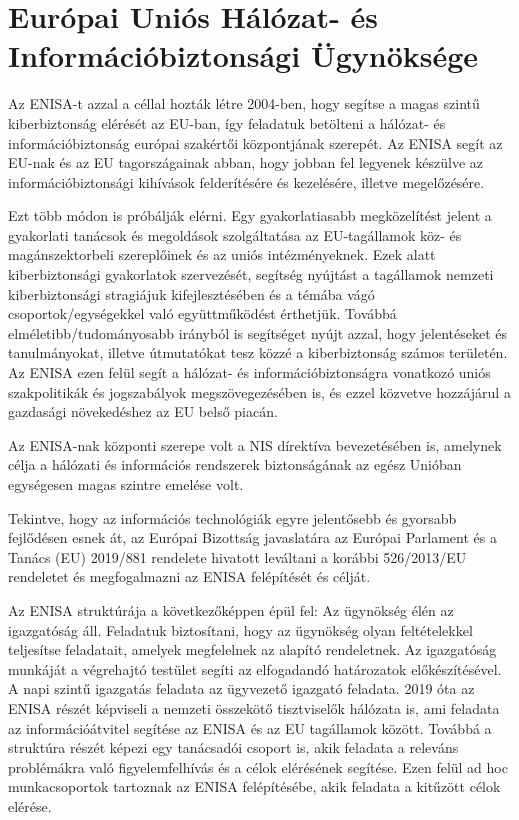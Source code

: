 \section{Európai Uniós Hálózat- és Információbiztonsági Ügynöksége}

Az ENISA-t azzal a céllal hozták létre 2004-ben, hogy segítse a magas szintű kiberbiztonság elérését az EU-ban, így feladatuk betölteni a hálózat- és információbiztonság európai szakértői központjának szerepét. Az ENISA segít az EU-nak és az EU tagországainak abban, hogy jobban fel legyenek készülve az információbiztonsági kihívások felderítésére és kezelésére, illetve megelőzésére.

Ezt több módon is próbálják elérni. Egy gyakorlatiasabb megközelítést jelent a gyakorlati tanácsok és megoldások szolgáltatása az EU-tagállamok köz- és magánszektorbeli szereplőinek és az uniós intézményeknek. Ezek alatt kiberbiztonsági gyakorlatok szervezését, segítség nyújtást a tagállamok nemzeti kiberbiztonsági stragiájuk kifejlesztésében és a témába vágó csoportok/egységekkel való együttműködést érthetjük. Továbbá elméletibb/tudományosabb irányból is segítséget nyújt azzal, hogy jelentéseket és tanulmányokat, illetve útmutatókat tesz közzé a kiberbiztonság számos területén. Az ENISA ezen felül segít a hálózat- és információbiztonságra vonatkozó uniós szakpolitikák és jogszabályok megszövegezésében is, és ezzel közvetve hozzájárul a gazdasági növekedéshez az EU belső piacán.

Az ENISA-nak központi szerepe volt a NIS dírektíva bevezetésében is, amelynek célja a hálózati és információs rendszerek biztonságának az egész Unióban egységesen magas szintre emelése volt. \cite{NIS-direktiva}

Tekintve, hogy az információs technológiák egyre jelentősebb és gyorsabb fejlődésen esnek át, az Európai Bizottság javaslatára az Európai Parlament és a Tanács (EU) 2019/881 rendelete \cite{2019/881} hivatott leváltani a korábbi 526/2013/EU rendeletet és megfogalmazni az ENISA felépítését és célját.

Az ENISA struktúrája a következőképpen épül fel: Az ügynökség élén az igazgatóság áll. Feladatuk biztosítani, hogy az ügynökség olyan feltételekkel teljesítse feladatait, amelyek megfelelnek az alapító rendeletnek. Az igazgatóság munkáját a végrehajtó testület segíti az elfogadandó határozatok előkészítésével. A napi szintű igazgatás feladata az ügyvezető igazgató feladata. 2019 óta az ENISA részét képviseli a nemzeti összekötő tisztviselők hálózata is, ami feladata az információátvitel segítése az ENISA és az EU tagállamok között. Továbbá a struktúra részét képezi egy tanácsadói csoport is, akik feladata a releváns problémákra való figyelemfelhívás és a célok elérésének segítése. Ezen felül ad hoc munkacsoportok tartoznak az ENISA felépítésébe, akik feladata a kitűzött célok elérése.

